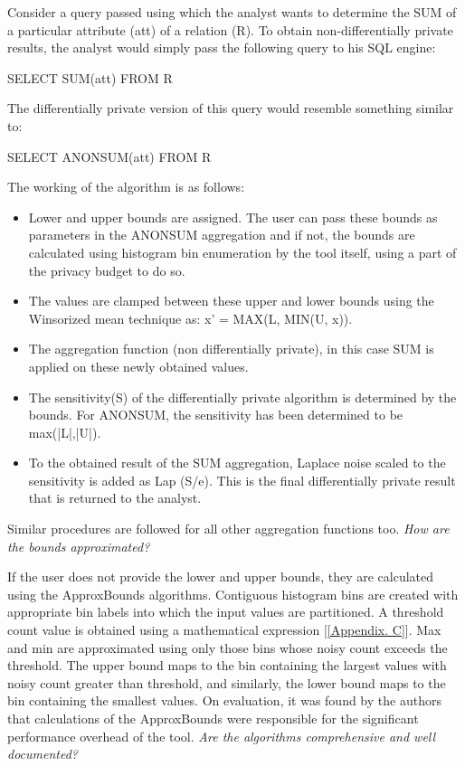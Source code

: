 \documentclass[acmsmall]{acmart}
\begin{document}
Consider a query passed using which the analyst wants to determine the SUM of a particular attribute (att) of a relation (R). To obtain non-differentially private results, the analyst would simply pass the following query to his SQL engine:
\begin{center}
    SELECT SUM(att) FROM R
\end{center}
The differentially private version of this query would resemble something similar to:
\begin{center}
    SELECT ANON\textunderscore SUM(att) FROM R
\end{center}
The working of the algorithm is as follows:
\begin{itemize}
    \item Lower and upper bounds are assigned. The user can pass these bounds as parameters in the ANON\textunderscore SUM aggregation and if not, the bounds are calculated using histogram bin enumeration by the tool itself, using a part of the privacy budget to do so.
    \item The values are clamped between these upper and lower bounds using the Winsorized mean technique as: x’ = MAX(L, MIN(U, x)).
    \item The aggregation function (non differentially private), in this case SUM is applied on these newly obtained values.
    \item The sensitivity(S) of the differentially private algorithm is determined by the bounds. For ANON\textunderscore SUM, the sensitivity has been determined to be max(|L|,|U|).
    \item To the obtained result of the SUM aggregation, Laplace noise scaled to the sensitivity is added as Lap (S/e). This is the final differentially private result that is returned to the analyst.
\end{itemize}
Similar procedures are followed for all other aggregation functions too.
\newline
\newline
\textit{How are the bounds approximated?}

If the user does not provide the lower and upper bounds, they are calculated using the ApproxBounds algorithms. Contiguous histogram bins are created with appropriate bin labels into which the input values are partitioned. A threshold count value is obtained using a mathematical expression [\ref{Appendix. C}].
Max and min are approximated using only those bins whose noisy count exceeds the threshold. The upper bound maps to the bin containing the largest values with noisy count greater than threshold, and similarly, the lower bound maps to the bin containing the smallest values. On evaluation, it was found by the authors that calculations of the ApproxBounds were responsible for the significant performance overhead of the tool.
\newline
\newline
\textit{Are the algorithms comprehensive and well documented?}
\end{document}
